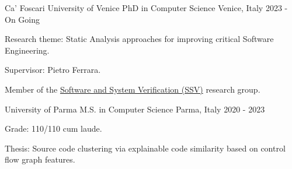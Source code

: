 
\begin{cventries}

  \cventry
    {Ca' Foscari University of Venice} %
    {PhD in Computer Science} %
    {Venice, Italy} %
    {2023 - On Going} %
    {
        \begin{cvitems} %
            \item {Research theme: Static Analysis approaches for improving critical Software Engineering.}
            \item {Supervisor: Pietro Ferrara.}
            \item {Member of the \href{https://unive-ssv.github.io/}{Software and System Verification (SSV)} research group.}
        \end{cvitems}
    }

  \cventry
    {University of Parma} %
    {M.S. in Computer Science} %
    {Parma, Italy} %
    {2020 - 2023} %
    {
      \begin{cvitems} %
        \item {Grade: 110/110 cum laude.}
        \item {Thesis: Source code clustering via explainable code similarity based on control flow graph features.}
      \end{cvitems}
    }


\end{cventries}
